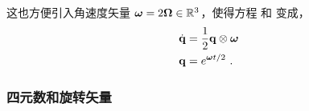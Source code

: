 这也方便引入角速度矢量 ${\bm \omega}=2{\bm \Omega}\in{\mathbb R}^3$，使得方程  和  变成，
%
\begin{align}
\dot{{\bf q}} &= \frac12{\bf q}\otimes{\bm \omega} \label{equ:qdot} \\ 
{\bf q} &= e^{{\bm \omega} t/2}
~.
\end{align}
%


\subsubsection{四元数和旋转矢量}
\label{sec:quatAndVector}

